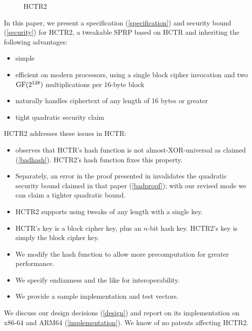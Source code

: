 \documentclass[hctr2.tex]{subfiles}
\begin{document}
\begin{figure}
    
    \caption{HCTR2}\label{hctr2fig}
\end{figure}
In this paper, we present a specification (\autoref{specification})
and security bound (\autoref{security}) for HCTR2, a tweakable SPRP
based on HCTR\cite{hctr} and inheriting the following advantages:
\begin{itemize}
    \item simple
    \item efficient on modern processors, using a single block cipher
    invocation and two \(\operatorname{GF}(2^{128})\) multiplications per 16-byte
    block
    \item naturally handles ciphertext of any length of 16 bytes or greater
    \item tight quadratic security claim
\end{itemize}
HCTR2 addresses these issues in HCTR:
\begin{itemize}
    \item \cite{kumarhctr} observes that HCTR's hash function
    is not almost-XOR-universal\cite{eadu} as claimed (\autoref{badhash}).
    HCTR2's hash function fixes this property.
    \item Separately,
    an error in the proof presented in \cite{hctrquad}
    invalidates the quadratic security bound claimed in that paper (\autoref{badproof}); with our revised
    mode we can claim a tighter quadratic bound.
    \item HCTR2 supports using tweaks of any length with a single key.
    \item HCTR's key is a block cipher key, plus an \(n\)-bit
    hash key. HCTR2's key is simply
    the block cipher key.
    \item We modify the hash function to allow more precomputation
    for greater performance.
    \item We specify endianness and the like for interoperability.
    \item We provide a sample implementation and test vectors.
\end{itemize}
We discuss our design decisions (\autoref{design})
and report on its implementation on x86-64 and ARM64 (\autoref{implementation}).
We know of no patents affecting HCTR2.
\end{document}

